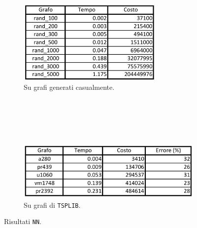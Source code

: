 \begin{figure}[H]
    \centering
    \begin{subfigure}{\linewidth}
        \centering
        \includegraphics[width=200pt]{img/NNrandom.png}
        \caption*{Su grafi generati casualmente.}
    \end{subfigure}
    \ \\
    \ \\
    \ \\
    \ \\
    \begin{subfigure}{\linewidth}
        \centering
        \includegraphics[width=300pt]{img/NNtsplib.png}
        \caption*{Su grafi di \texttt{TSPLIB}.}
    \end{subfigure}
    \caption{Risultati \texttt{NN}.}
\end{figure}
\ \\
\ \\

